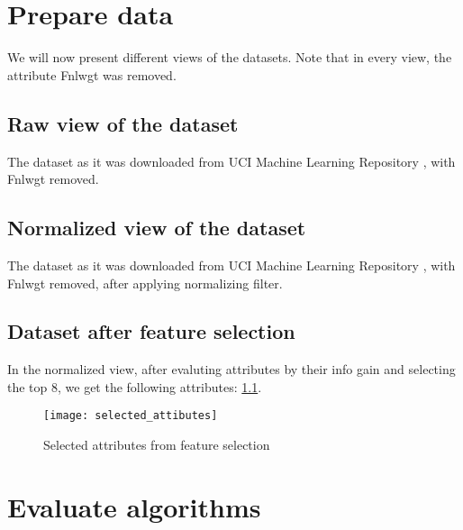 \chapter{Prepare data}
We will now present different views of the datasets. Note that in every view, the attribute Fnlwgt was removed.
\section{Raw view of the dataset}
The dataset as it was downloaded from UCI Machine Learning Repository \cite{uci-link}, with Fnlwgt removed.
\section{Normalized view of the dataset}
The dataset as it was downloaded from UCI Machine Learning Repository \cite{uci-link}, with Fnlwgt removed, after applying normalizing filter.
\section{Dataset after feature selection}
In the normalized view, after evaluting attributes by their info gain and selecting the top 8, we get the following attributes: \ref{fig:attr}.
\begin{figure}
    \centering
    \texttt{[image: selected\_attibutes]}
    \caption{Selected attributes from feature selection}
    \label{fig:attr}
\end{figure}

\chapter{Evaluate algorithms}
